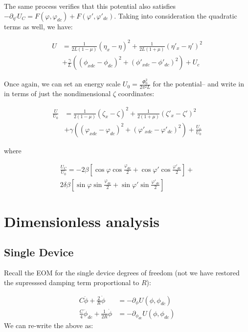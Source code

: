 \documentclass[paper=a4, twocolumn, fontsize=10pt]{article} %
\numberwithin{equation}{section} %
\numberwithin{figure}{section} %
\numberwithin{table}{section} %
\begin{document}
The same process verifies that this potential also satisfies $-\partial_{\eta'} U_C = F(\varphi, \varphi_{dc}) + F(\varphi', \varphi'_{dc}) $. Taking into consideration the quadratic terms as well, we have:

\begin{align*}
U &= \frac{1}{2L(1-\mu)} (\eta_x-\eta)^2 + \frac{1}{2L(1+\mu)} (\eta'_x-\eta')^2 \\
 &+ \frac{\gamma}{L} \left( (\phi_{xdc}-\phi_{dc})^2 + (\phi'_{xdc}-\phi'_{dc})^2\right) + U_c
\end{align*}

Once again, we can set an energy scale $U_0 = \frac{\Phi_0^2}{2\pi^2L}$ for the potential-- and write in in terms of just the nondimensional $\zeta$ coordinates:


\begin{align*}
\frac{U}{U_0} &= \frac{1}{2(1-\mu)} (\zeta_x-\zeta)^2 + \frac{1}{2(1+\mu)} (\zeta'_x-\zeta')^2 \\
 &+ \gamma \left( (\varphi_{xdc}-\varphi_{dc})^2 + (\varphi'_{xdc}-\varphi'_{dc})^2\right) + \frac{U_c}{U_0}
\end{align*}

where

\begin{multline}
    \frac{U_C}{U_0} = -2\beta \left[ \cos\varphi\cos\frac{\varphi_{dc}}{2} + \cos\varphi'\cos\frac{\varphi'_{dc}}{2} \right] + \\
    2\delta\beta \left[ \sin\varphi\sin\frac{\varphi_{dc}}{2} + \sin\varphi'\sin\frac{\varphi'_{dc}}{2} \right]
\end{multline}

\section{Dimensionless analysis}

\subsection{Single Device}

Recall the EOM for the single device degrees of freedom (not we have restored the supresssed damping term proportional to $R$):

\begin{align}
    C \ddot{\phi} + \frac{2}{R} \dot{\phi} &= - \partial_\phi U(\phi, \phi_{dc})
    \\
    \frac{C}{4} \ddot{\phi}_{dc} + \frac{1}{2R} \dot{\phi} &= - \partial_{\phi_{dc}} U(\phi, \phi_{dc})
    \end{align}
We can re-write the above as:
\end{document}
